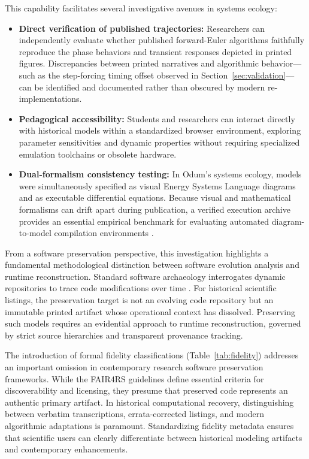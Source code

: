\documentclass[11pt,a4paper]{article}
\begin{document}
This capability facilitates several investigative avenues in systems ecology:
\begin{itemize}
\item \textbf{Direct verification of published trajectories:} Researchers can independently evaluate whether published forward-Euler algorithms faithfully reproduce the phase behaviors and transient responses depicted in printed figures. Discrepancies between printed narratives and algorithmic behavior—such as the step-forcing timing offset observed in Section~\ref{sec:validation}—can be identified and documented rather than obscured by modern re-implementations.
\item \textbf{Pedagogical accessibility:} Students and researchers can interact directly with historical models within a standardized browser environment, exploring parameter sensitivities and dynamic properties without requiring specialized emulation toolchains or obsolete hardware.
\item \textbf{Dual-formalism consistency testing:} In Odum's systems ecology, models were simultaneously specified as visual Energy Systems Language diagrams and as executable differential equations. Because visual and mathematical formalisms can drift apart during publication, a verified execution archive provides an essential empirical benchmark for evaluating automated diagram-to-model compilation environments \citep{energese,gssk}.
\end{itemize}

From a software preservation perspective, this investigation highlights a fundamental methodological distinction between software evolution analysis and runtime reconstruction. Standard software archaeology interrogates dynamic repositories to trace code modifications over time \citep{huntThomas2002,robles2005,spinellis2021}. For historical scientific listings, the preservation target is not an evolving code repository but an immutable printed artifact whose operational context has dissolved. Preserving such models requires an evidential approach to runtime reconstruction, governed by strict source hierarchies and transparent provenance tracking.

The introduction of formal fidelity classifications (Table~\ref{tab:fidelity}) addresses an important omission in contemporary research software preservation frameworks. While the FAIR4RS guidelines \citep{barker2022} define essential criteria for discoverability and licensing, they presume that preserved code represents an authentic primary artifact. In historical computational recovery, distinguishing between verbatim transcriptions, errata-corrected listings, and modern algorithmic adaptations is paramount. Standardizing fidelity metadata ensures that scientific users can clearly differentiate between historical modeling artifacts and contemporary enhancements.
\end{document}

